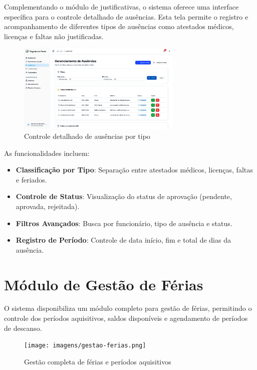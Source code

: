 Complementando o módulo de justificativas, o sistema oferece uma interface específica para o controle detalhado de ausências. Esta tela permite o registro e acompanhamento de diferentes tipos de ausências como atestados médicos, licenças e faltas não justificadas.

\begin{figure}[H]
\centering
\includegraphics[width=0.7\textwidth]{imagens/controle-ausencias.png}
\caption{Controle detalhado de ausências por tipo}
\label{fig:controle-ausencias}
\end{figure}

As funcionalidades incluem:

\begin{itemize}
\item \textbf{Classificação por Tipo}: Separação entre atestados médicos, licenças, faltas e feriados.
\item \textbf{Controle de Status}: Visualização do status de aprovação (pendente, aprovada, rejeitada).
\item \textbf{Filtros Avançados}: Busca por funcionário, tipo de ausência e status.
\item \textbf{Registro de Período}: Controle de data início, fim e total de dias da ausência.
\end{itemize}

\section{Módulo de Gestão de Férias}

O sistema disponibiliza um módulo completo para gestão de férias, permitindo o controle dos períodos aquisitivos, saldos disponíveis e agendamento de períodos de descanso.

\begin{figure}[H]
\centering
\texttt{[image: imagens/gestao-ferias.png]}
\caption{Gestão completa de férias e períodos aquisitivos}
\label{fig:gestao-ferias}
\end{figure}

